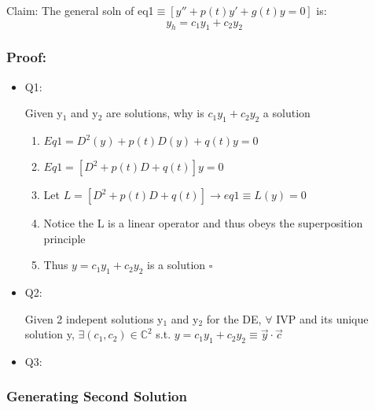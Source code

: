 \documentclass[11pt]{article}
\begin{document}
    Claim: The general soln of eq1$\equiv [y''+p(t)y'+g(t)y=0]$ is:
    \begin{equation}
    y_h=c_1y_1+c_2 y_2
    \end{equation}
\subsubsection{Proof:}
\label{sec-11.4.3}

\begin{itemize}

\item Q1:\\
\label{sec-11.4.3.1}

     Given y$_1$ and y$_2$ are solutions, why is $c_1y_1+c_2y_2$ a solution
\begin{enumerate}
\item $Eq1=D^2(y)+p(t)D(y)+q(t)y=0$
\item $Eq1=[D^2+p(t)D+q(t)]y=0$
\item Let $L=[D^2+p(t)D+q(t)]\rightarrow eq1\equiv L(y)=0$
\item Notice the L is a linear operator and thus obeys the
           superposition principle
\item Thus $y = c_1 y_1 +c_2 y_2$ is a solution $\square$
\end{enumerate}

\item Q2:\\
\label{sec-11.4.3.2}

     Given 2 indepent solutions y$_1$ and y$_2$ for the DE, $\forall$ IVP and its unique solution y, $\exists (c_1,c_2)
        \in \mathbb{C}^2$ s.t. $y=c_1y_1 + c_2y_2 \equiv \vec{y}\cdot\vec{c}$
        

\item Q3:\\
\label{sec-11.4.3.3}

\end{itemize} %
\subsubsection{Generating Second Solution}
\label{sec-11.4.4}
\end{document}
